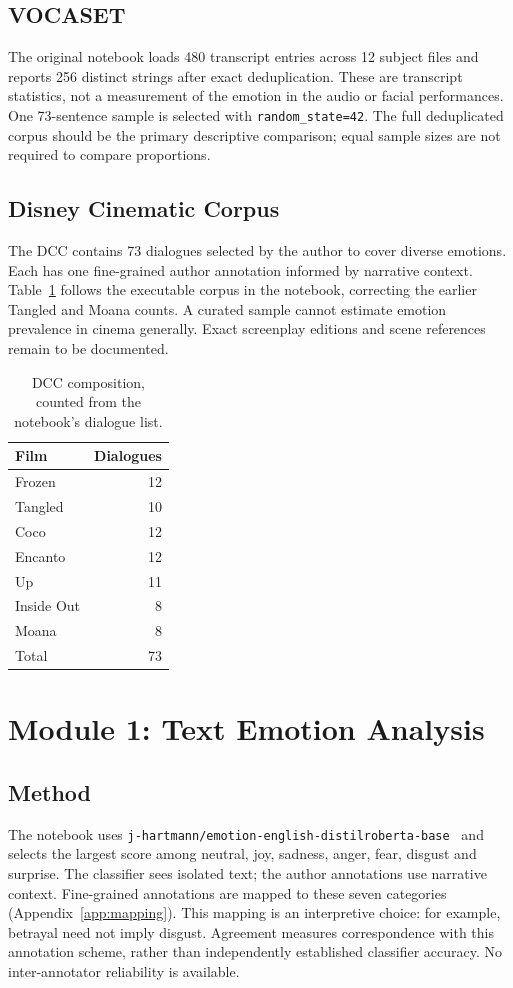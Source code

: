 \documentclass[10pt]{article}
\begin{document}
\subsection{VOCASET}
The original notebook loads 480 transcript entries across 12 subject files and
reports 256 distinct strings after exact deduplication. These are transcript
statistics, not a measurement of the emotion in the audio or facial performances.
One 73-sentence sample is selected with \texttt{random\_state=42}. The full
deduplicated corpus should be the primary descriptive comparison; equal sample
sizes are not required to compare proportions.

\subsection{Disney Cinematic Corpus}
The DCC contains 73 dialogues selected by the author to cover diverse emotions.
Each has one fine-grained author annotation informed by narrative context. Table~\ref{tab:dcc}
follows the executable corpus in the notebook, correcting the earlier Tangled and
Moana counts. A curated sample cannot estimate emotion prevalence in cinema generally.
Exact screenplay editions and scene references remain to be documented.

\begin{table}[H]
\centering\small
\caption{DCC composition, counted from the notebook's dialogue list.}
\label{tab:dcc}
\begin{tabular}{lr}
\toprule Film & Dialogues \\\midrule
Frozen & 12 \\ Tangled & 10 \\ Coco & 12 \\ Encanto & 12 \\
Up & 11 \\ Inside Out & 8 \\ Moana & 8 \\\midrule
Total & 73 \\\bottomrule
\end{tabular}
\end{table}

\section{Module 1: Text Emotion Analysis}
\subsection{Method}
The notebook uses \texttt{j-hartmann/emotion-english-distilroberta-base}~\cite{hartmann}
and selects the largest score among neutral, joy, sadness, anger, fear, disgust and
surprise. The classifier sees isolated text; the author annotations use narrative
context. Fine-grained annotations are mapped to these seven categories (Appendix~\ref{app:mapping}).
This mapping is an interpretive choice: for example, betrayal need not imply disgust.
Agreement measures correspondence with this annotation scheme, rather than
independently established classifier accuracy. No inter-annotator reliability is available.
\end{document}
